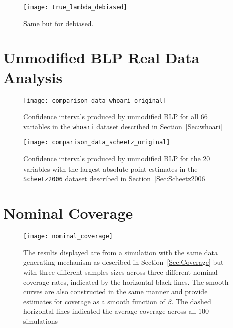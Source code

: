 \begin{appendices}
\begin{figure}[hbtp]
  \begin{center}
  \texttt{[image: true\_lambda\_debiased]}
  \caption{\label{Fig:true_lambda_debias} Same but for debiased.}
  \end{center}
\end{figure}

\newpage

\section{Unmodified BLP Real Data Analysis}
\label{Sup:C}

\begin{figure}[hbtp]
  \begin{center}
  \texttt{[image: comparison\_data\_whoari\_original]}
  \caption{\label{Fig:comparison_data_whoari_original} Confidence intervals produced by unmodified BLP for all 66 variables in the \texttt{whoari} dataset described in Section~\ref{Sec:whoari}}
  \end{center}
\end{figure}

\begin{figure}[hbtp]
  \begin{center}
  \texttt{[image: comparison\_data\_scheetz\_original]}
  \caption{\label{Fig:comparison_data_scheetz_original} Confidence intervals produced by unmodified BLP for the 20 variables with the largest absolute point estimates in the \texttt{Scheetz2006} dataset described in Section~\ref{Sec:Scheetz2006}}
  \end{center}
\end{figure}

\newpage

\section{Nominal Coverage}\label{Sup:D}

\begin{figure}[hbtp]
  \begin{center}
  \texttt{[image: nominal\_coverage]}
  \caption{\label{Fig:nominal_coverage}  The results displayed are from a simulation with the same data generating mechanism as described in Section~\ref{Sec:Coverage} but with three different samples sizes across three different nominal coverage rates, indicated by the horizontal black lines. The smooth curves are also constructed in the same manner and provide estimates for coverage as a smooth function of $\beta$. The dashed horizontal lines indicated the average coverage across all 100 simulations}
  \end{center}
\end{figure} 


\end{appendices}
